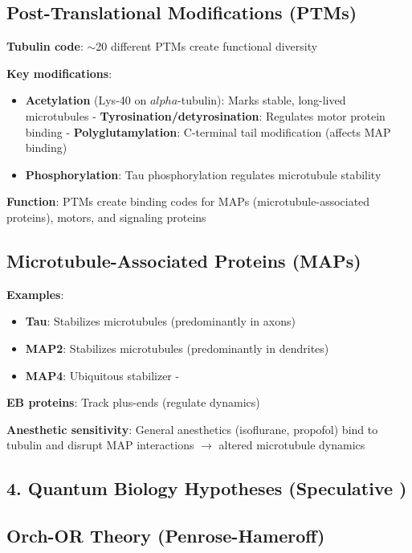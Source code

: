 \subsection{Post-Translational Modifications
(PTMs)}\label{post-translational-modifications-ptms}

\textbf{Tubulin code}: $\sim$20 different PTMs create
functional diversity

\textbf{Key modifications}:
\begin{itemize}
\item \textbf{Acetylation} (Lys-40 on
$alpha$-tubulin): Marks stable, long-lived microtubules
- \textbf{Tyrosination/detyrosination}: Regulates motor protein binding
- \textbf{Polyglutamylation}: C-terminal tail modification (affects MAP
binding)
\item \textbf{Phosphorylation}: Tau phosphorylation regulates
microtubule stability
\end{itemize}


\textbf{Function}: PTMs create binding codes for MAPs
(microtubule-associated proteins), motors, and signaling proteins

\subsection{Microtubule-Associated Proteins
(MAPs)}\label{microtubule-associated-proteins-maps}

\textbf{Examples}:
\begin{itemize}
\item \textbf{Tau}: Stabilizes microtubules
(predominantly in axons)
\item \textbf{MAP2}: Stabilizes microtubules
(predominantly in dendrites)
\item \textbf{MAP4}: Ubiquitous stabilizer -
\end{itemize}

\textbf{EB proteins}: Track plus-ends (regulate dynamics)

\textbf{Anesthetic sensitivity}: General anesthetics (isoflurane,
propofol) bind to tubulin and disrupt MAP interactions
$\rightarrow$ altered microtubule dynamics

\subsection{4. Quantum Biology Hypotheses (Speculative
)}\label{quantum-biology-hypotheses-speculative}

\subsection{Orch-OR Theory
(Penrose-Hameroff)}\label{orch-or-theory-penrose-hameroff}

